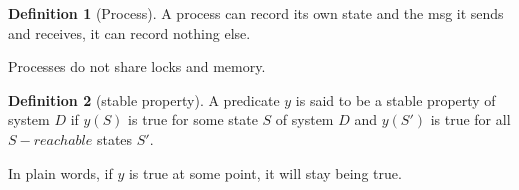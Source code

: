 \documentclass{article}
\theoremstyle{definition}
\newtheorem{definition}{Definition}[section]
\theoremstyle{remark}
\begin{document}
\begin{definition}[Process]
A process can record its own state and the msg it sends and receives, it can record nothing else.

Processes do not share locks and memory.
\end{definition}


\begin{definition}[stable property]
A predicate $y$ is said to be a stable property of system $D$ if $y(S)$ is true for some state $S$ of system $D$ and $y(S')$ is true for all $S-reachable$ states $S'$.

In plain words, if $y$ is true at some point, it will stay being true.
\end{definition}
\end{document}
